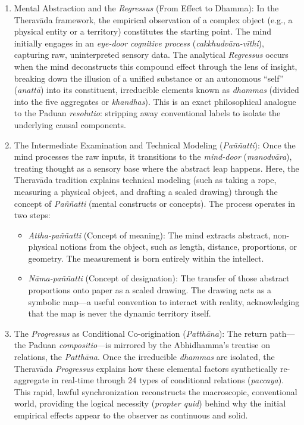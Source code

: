 \documentclass[11pt, a4paper]{article}
\begin{document}
\begin{enumerate}
	\item \textrm{Mental Abstraction and the \textit{Regressus} (From Effect to Dhamma):} In the Theravāda framework, the empirical observation of a complex object (e.g., a physical entity or a territory) constitutes the starting point. The mind initially engages in an \textit{eye-door cognitive process} (\textit{cakkhudvāra-vīthi}), capturing raw, uninterpreted sensory data. The analytical \textit{Regressus} occurs when the mind deconstructs this compound effect through the lens of insight, breaking down the illusion of a unified substance or an autonomous ``self'' (\textit{anattā}) into its constituent, irreducible elements known as \textit{dhammas} (divided into the five aggregates or \textit{khandhas}). This is an exact philosophical analogue to the Paduan \textit{resolutio}: stripping away conventional labels to isolate the underlying causal components.

	\item \textrm{The Intermediate Examination and Technical Modeling (\textit{Paññatti}):} Once the mind processes the raw inputs, it transitions to the \textit{mind-door} (\textit{manodvāra}), treating thought as a sensory base where the abstract leap happens. Here, the Theravāda tradition explains technical modeling (such as taking a rope, measuring a physical object, and drafting a scaled drawing) through the concept of \textrm{\textit{Paññatti}} (mental constructs or concepts). The process operates in two steps:
	\begin{itemize}
\item \textit{Attha-paññatti} (Concept of meaning): The mind extracts abstract, non-physical notions from the object, such as length, distance, proportions, or geometry. The measurement is born entirely within the intellect.
\item \textit{Nāma-paññatti} (Concept of designation): The transfer of those abstract proportions onto paper as a scaled drawing. The drawing acts as a symbolic map—a useful convention to interact with reality, acknowledging that the map is never the dynamic territory itself.
	\end{itemize}

	\item \textrm{The \textit{Progressus} as Conditional Co-origination (\textit{Patthāna}):} The return path—the Paduan \textit{compositio}—is mirrored by the Abhidhamma's treatise on relations, the \textit{Patthāna}. Once the irreducible \textit{dhammas} are isolated, the Theravāda \textit{Progressus} explains how these elemental factors synthetically re-aggregate in real-time through 24 types of conditional relations (\textit{paccaya}). This rapid, lawful synchronization reconstructs the macroscopic, conventional world, providing the logical necessity (\textit{propter quid}) behind why the initial empirical effects appear to the observer as continuous and solid.


\end{enumerate}
\end{document}
